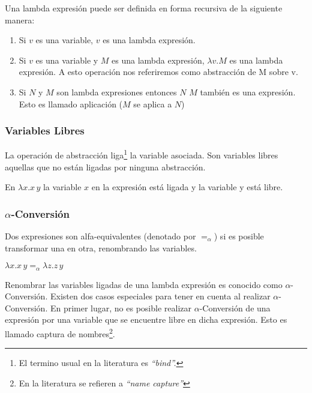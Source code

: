 \begin{defi} 
  \label{lambdaExpr}
  Una lambda expresión puede ser definida en forma recursiva de la
  siguiente manera:
  \begin{enumerate}
  \item Si $v$ es una variable, $v$ es una lambda expresión.
  \item Si $v$ es una variable y $M$ es una lambda expresión, $\lambda v . M$ es una
    lambda expresión. A esto operación nos referiremos como abstracción de M sobre v.
  \item Si $N$ y $M$ son lambda expresiones entonces $N$ $M$ también es una
    expresión. Esto es llamado aplicación ($M$ se aplica a $N$)
  \end{enumerate}
\end{defi}

\subsubsection{Variables Libres}

La operación de abstracción liga\footnote{El termino usual en la literatura es
  \it{``bind''}.} la variable asociada. Son variables libres aquellas que no están
ligadas por ninguna abstracción.

\begin{ejem}
  En $\lambda x . x\,y$ la variable $x$ en la expresión está ligada y la variable y está
  libre.
\end{ejem}

\subsubsection{$\alpha$-Conversión}

Dos expresiones son alfa-equivalentes (denotado por $=_{\alpha}$) si es posible
transformar una en otra, renombrando las variables.

\begin{ejem}
  $\lambda x . x\,y =_{\alpha} \lambda z . z\,y$
\end{ejem}

Renombrar las variables ligadas de una lambda expresión es conocido como
$\alpha$-Conversión. Existen dos casos especiales para tener en cuenta al realizar 
$\alpha$-Conversión. En primer lugar, no es posible realizar $\alpha$-Conversión de una expresión
por una variable que se encuentre libre en dicha expresión. Esto es llamado captura
de nombres\footnote{En la literatura se refieren a \it{``name capture''}}.

